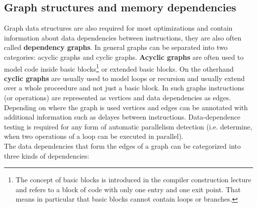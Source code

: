 \documentclass[a4paper,10pt]{article}
\begin{document}
\subsection{Graph structures and memory dependencies}
\label{sec:graphs}
Graph data structures are also required for most optimizations and contain information about data dependencies between instructions, they are also often called \textbf{dependency graphs}. In general graphs can be separated into two categories: acyclic graphs and cyclic graphs. \textbf{Acyclic graphs} are often used to model code inside basic blocks\footnote{ The concept of basic blocks is introduced in the compiler construction lecture and refers to a block of code with only one entry and one exit point. That means in particular that basic blocks cannot contain loops or branches.
} or extended basic blocks. On the otherhand \textbf{cyclic graphs} are usually used to model loops or recursion and usually extend over a whole proceedure and not just a basic block. In such graphs instructions (or operations) are represented as vertices and data dependencies as edges. Depending on where the graph is used vertices and edges can be annotated with additional information such as delayes between instructions. Data-dependence testing is required for any form of automatic parallelism detection (i.e. determine, when two operations of a loop can be executed in parallel).\\

The data dependencies that form the edges of a graph can be categorized into three kinds of dependencies:
\end{document}
